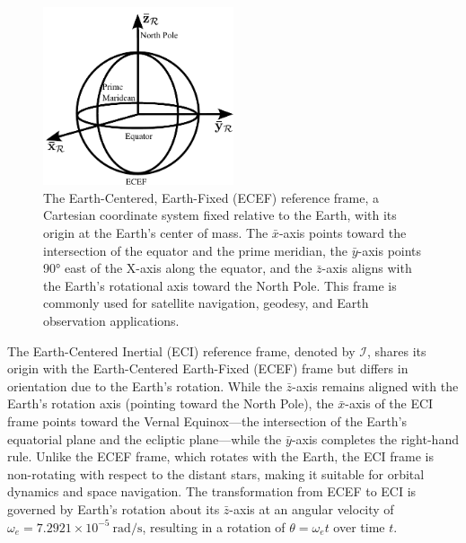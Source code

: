 \begin{figure}[H]
    \centering
    \includegraphics[width=0.5\textwidth]{figures/modelling/ECEF.pdf}
    \caption{The Earth-Centered, Earth-Fixed (ECEF) reference frame, a Cartesian coordinate system fixed relative to the Earth, with its origin at the Earth's center of mass. The $\bar{x}$-axis points toward the intersection of the equator and the prime meridian, the $\bar{y}$-axis points 90° east of the X-axis along the equator, and the $\bar{z}$-axis aligns with the Earth's rotational axis toward the North Pole. This frame is commonly used for satellite navigation, geodesy, and Earth observation applications.}
\end{figure}


\noindent The Earth-Centered Inertial (ECI) reference frame, denoted by $\mathcal{I}$, shares its origin with the Earth-Centered Earth-Fixed (ECEF) frame 
but differs in orientation due to the Earth's rotation. While the $\bar{z}$-axis remains aligned with the Earth's rotation axis (pointing toward the North Pole), the $\bar{x}$-axis 
of the ECI frame points toward the Vernal Equinox—the intersection of the Earth's equatorial plane and the ecliptic plane—while the $\bar{y}$-axis completes the right-hand rule. 
Unlike the ECEF frame, which rotates with the Earth, the ECI frame is non-rotating with respect to the distant stars, making it suitable for orbital dynamics and space 
navigation. The transformation from ECEF to ECI is governed by Earth's rotation about its $\bar{z}$-axis at an angular velocity of $\omega_e = 7.2921 \times 10^{-5}~\text{rad/s}$, 
resulting in a rotation of $\theta = \omega_e t$ over time $t$.
\vspace{0.5cm}

